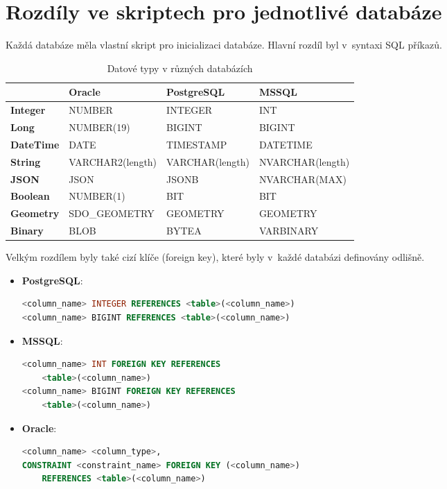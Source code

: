 \section{Rozdíly ve skriptech pro jednotlivé databáze}
Každá databáze měla vlastní skript pro inicializaci databáze.  
Hlavní rozdíl byl v~syntaxi SQL příkazů.

\renewcommand{\arraystretch}{1.3}
\begin{table}[!h]
\centering
\caption{Datové typy v různých databázích}
\label{tab:datove_typy}
    \begin{tabular}{|l|l|l|l|}
        \hline
         & \textbf{Oracle} & \textbf{PostgreSQL} & \textbf{MSSQL} \\ \hline
        \textbf{Integer}     & NUMBER           & INTEGER           & INT               \\ \hline
        \textbf{Long}        & NUMBER(19)       & BIGINT            & BIGINT            \\ \hline
        \textbf{DateTime}    & DATE             & TIMESTAMP         & DATETIME          \\ \hline
        \textbf{String}      & VARCHAR2(length) & VARCHAR(length)   & NVARCHAR(length)  \\ \hline
        \textbf{JSON}        & JSON             & JSONB             & NVARCHAR(MAX)     \\ \hline
        \textbf{Boolean}     & NUMBER(1)        & BIT               & BIT               \\ \hline
        \textbf{Geometry}    & SDO\_GEOMETRY    & GEOMETRY          & GEOMETRY          \\ \hline
        \textbf{Binary}      & BLOB             & BYTEA             & VARBINARY         \\ \hline
    \end{tabular}
\end{table}

Velkým rozdílem byly také cizí klíče (foreign key), které byly v~každé databázi definovány odlišně.

\begin{itemize}
    \item \textbf{PostgreSQL}:
    \begin{lstlisting}[language=sql]
<column_name> INTEGER REFERENCES <table>(<column_name>)
<column_name> BIGINT REFERENCES <table>(<column_name>)
    \end{lstlisting}

    \item \textbf{MSSQL}:
    \begin{lstlisting}[language=sql]
<column_name> INT FOREIGN KEY REFERENCES 
    <table>(<column_name>)
<column_name> BIGINT FOREIGN KEY REFERENCES 
    <table>(<column_name>)
    \end{lstlisting}
    
    \newpage

    \item \textbf{Oracle}:
    \begin{lstlisting}[language=sql]
<column_name> <column_type>,
CONSTRAINT <constraint_name> FOREIGN KEY (<column_name>) 
    REFERENCES <table>(<column_name>)
    \end{lstlisting}
\end{itemize}